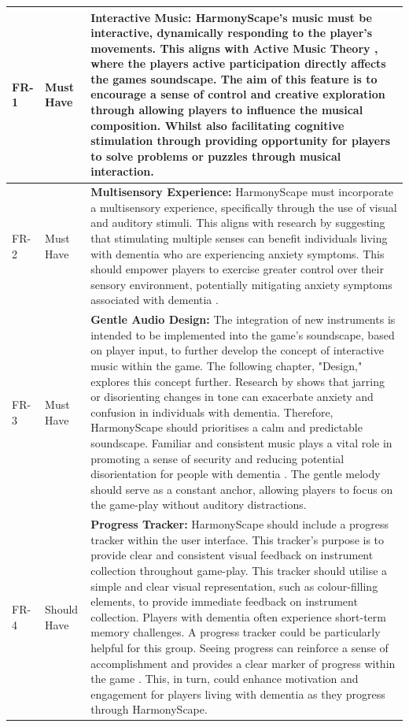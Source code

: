 \documentclass{l4proj}
\begin{document}
\begin{longtable}{|p{1.5cm}|p{1.5cm}|p{10cm}|}
FR-1 & Must Have & \textbf{Interactive Music:} HarmonyScape's music must be interactive, dynamically responding to the player's movements. This aligns with Active Music Theory \citep{vink_music_2004}, where the players active participation directly affects the games soundscape. The aim of this feature is to encourage a sense of control and creative exploration through allowing players to influence the musical composition. Whilst also facilitating cognitive stimulation through providing opportunity for players to solve problems or puzzles through musical interaction. \\ 
\hline
FR-2 & Must Have & \textbf{Multisensory Experience:} HarmonyScape must incorporate a multisensory experience, specifically through the use of visual and auditory stimuli. This aligns with research by \cite{sanchez_comparing_2016} suggesting that stimulating multiple senses can benefit individuals living with dementia who are experiencing anxiety symptoms. This should empower players to exercise greater control over their sensory environment, potentially mitigating anxiety symptoms associated with dementia \citep{sanchez_comparing_2016}. \\
\hline 
FR-3 & Must Have & \textbf{Gentle Audio Design:} The integration of new instruments is intended to be implemented into the game's soundscape, based on player input, to further develop the concept of interactive music within the game. The following chapter, "Design," explores this concept further. Research by \cite{shirsat_music_nodate} shows that jarring or disorienting changes in tone can exacerbate anxiety and confusion in individuals with dementia. Therefore, HarmonyScape should prioritises a calm and predictable soundscape. Familiar and consistent music plays a vital role in promoting a sense of security and reducing potential disorientation for people with dementia \citep{caspar_nonpharmacological_2018}. The gentle melody should serve as a constant anchor, allowing players to focus on the game-play without auditory distractions.  \\ 
\hline
FR-4 & Should Have & \textbf{Progress Tracker:} HarmonyScape should include a progress tracker within the user interface. This tracker's purpose is to provide clear and consistent visual feedback on instrument collection throughout game-play. This tracker should utilise a simple and clear visual representation, such as colour-filling elements, to provide immediate feedback on instrument collection. Players with dementia often experience short-term memory challenges. A progress tracker could be particularly helpful for this group. Seeing progress can reinforce a sense of accomplishment and provides a clear marker of progress within the game \citep{bourgeois_comparison_2003}. This, in turn, could enhance motivation and engagement for players living with dementia as they progress through HarmonyScape. \\ 

\end{longtable}
\end{document}
